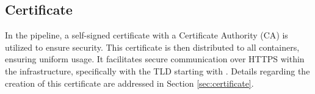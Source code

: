 \subsection{Certificate}
\label{sec:pipeline-local-certificate}
In the pipeline, a self-signed certificate with a Certificate Authority (\ac{CA}) is 
utilized to ensure security. This certificate is then distributed to all containers, 
ensuring uniform usage. It facilitates secure communication over HTTPS within the infrastructure, specifically with the \ac{TLD} starting with 
. Details regarding the creation of this certificate are addressed in Section \ref{sec:certificate}.